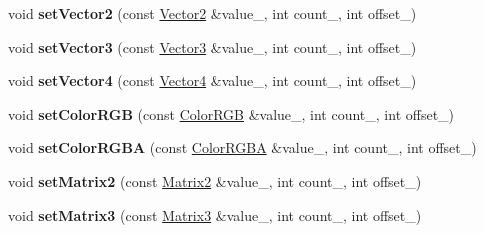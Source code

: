 \begin{DoxyCompactItemize}
\item 
void {\bfseries set\+Vector2} (const \hyperlink{class_i_dream_sky_1_1_vector2}{Vector2} \&value\+\_\+, int count\+\_, int offset\+\_)\hypertarget{class_i_dream_sky_1_1_g_x_uniform_aaf126cb85b48346a98f9fba5ea484941}{}\label{class_i_dream_sky_1_1_g_x_uniform_aaf126cb85b48346a98f9fba5ea484941}

\item 
void {\bfseries set\+Vector3} (const \hyperlink{class_i_dream_sky_1_1_vector3}{Vector3} \&value\+\_\+, int count\+\_, int offset\+\_)\hypertarget{class_i_dream_sky_1_1_g_x_uniform_a82761af8b17e8cb421d4758e3e472a99}{}\label{class_i_dream_sky_1_1_g_x_uniform_a82761af8b17e8cb421d4758e3e472a99}

\item 
void {\bfseries set\+Vector4} (const \hyperlink{class_i_dream_sky_1_1_vector4}{Vector4} \&value\+\_\+, int count\+\_, int offset\+\_)\hypertarget{class_i_dream_sky_1_1_g_x_uniform_ae80953a900b75434ec770b456c821852}{}\label{class_i_dream_sky_1_1_g_x_uniform_ae80953a900b75434ec770b456c821852}

\item 
void {\bfseries set\+Color\+R\+GB} (const \hyperlink{class_i_dream_sky_1_1_color_r_g_b}{Color\+R\+GB} \&value\+\_\+, int count\+\_, int offset\+\_)\hypertarget{class_i_dream_sky_1_1_g_x_uniform_a1450460f2f8ede94ac2942166e66ab9a}{}\label{class_i_dream_sky_1_1_g_x_uniform_a1450460f2f8ede94ac2942166e66ab9a}

\item 
void {\bfseries set\+Color\+R\+G\+BA} (const \hyperlink{class_i_dream_sky_1_1_color_r_g_b_a}{Color\+R\+G\+BA} \&value\+\_\+, int count\+\_, int offset\+\_)\hypertarget{class_i_dream_sky_1_1_g_x_uniform_aa9026da09d6c026a3d447439fbc4145a}{}\label{class_i_dream_sky_1_1_g_x_uniform_aa9026da09d6c026a3d447439fbc4145a}

\item 
void {\bfseries set\+Matrix2} (const \hyperlink{class_i_dream_sky_1_1_matrix2}{Matrix2} \&value\+\_\+, int count\+\_, int offset\+\_)\hypertarget{class_i_dream_sky_1_1_g_x_uniform_a7c4cd89adbc2f566e068080839191d4c}{}\label{class_i_dream_sky_1_1_g_x_uniform_a7c4cd89adbc2f566e068080839191d4c}

\item 
void {\bfseries set\+Matrix3} (const \hyperlink{class_i_dream_sky_1_1_matrix3}{Matrix3} \&value\+\_\+, int count\+\_, int offset\+\_)\hypertarget{class_i_dream_sky_1_1_g_x_uniform_a5181ea60360d1b3d82b986167279ea86}{}\label{class_i_dream_sky_1_1_g_x_uniform_a5181ea60360d1b3d82b986167279ea86}


\end{DoxyCompactItemize}

